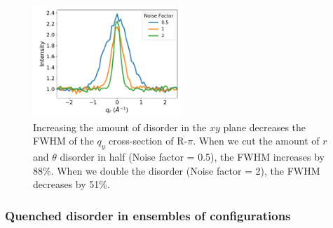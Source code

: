 \documentclass[journal=jpcbfk,manuscript=article]{achemso}
\begin{document}
  \begin{figure}
  \centering
  \includegraphics[width=0.5\textwidth]{qy_fwhm.pdf}
  \caption{Increasing the amount of disorder in the $xy$ plane decreases the
	  FWHM of the $q_y$ cross-section of R-$\pi$. When we cut the amount of $r$ and
	  $\theta$ disorder in half (Noise factor = 0.5), the FWHM increases by 88\%. When
	  we double the disorder (Noise factor = 2), the FWHM decreases by
	  51\%.}\label{fig:qy_fwhm}
  \end{figure}
  
  
  \subsubsection*{Quenched disorder in ensembles of configurations}  
  
\end{document}
